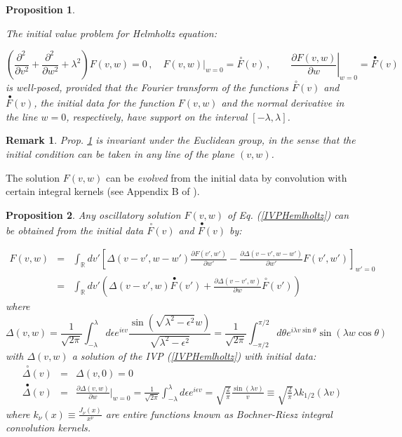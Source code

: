 \documentclass[11pt]{article}
\newtheorem{remark}[definition]{Remark}
\newtheorem{proposition}{Proposition}[section]
\def\Fc{\stackrel{\,\,\circ}{F}}
\def\Fb{\stackrel{\,\,\bullet}{F}}
\def\Dc{\stackrel{\,\,\circ}{\Delta}}
\def\Db{\stackrel{\,\,\bullet}{\Delta}}
\begin{document}
\begin{proposition}\label{PropIVP}
   
  The initial value problem for Helmholtz equation: 

  
\begin{equation}\label{IVPHemlholtz}
 \left(\frac{\partial^2\,}{\partial v^2}+\frac{\partial^2\,}{\partial w^2}+\lambda^2\right)F(v,w)=0 \,,\quad F(v,w)|_{w=0}=\Fc(v)\,,\qquad \left.\frac{\partial F(v,w)}{\partial w}\right|_{w=0}=\Fb(v)
\end{equation}
%
is well-posed, provided that the Fourier transform of the functions $\Fc(v)$ and  $\Fb(v)$, the initial data for the function  $F(v,w)$ and the normal derivative in the line $w=0$, respectively, have support on the interval $[-\lambda,\lambda]$.
\end{proposition}

\begin{remark}\label{RemarkInvariance}
 Prop. \ref{PropIVP}  is invariant under the Euclidean group, in the sense that the initial condition can be taken in any line of the plane $(v,w)$.
\end{remark}


The solution $F(v,w)$ can be \textit{evolved} from the initial data by convolution with certain integral kernels (see Appendix B of \cite{SphereMomentum20}).
%
\begin{proposition}\label{PropPropagationHelmholtz}
Any oscillatory solution $F(v,w)$ of Eq. (\ref{IVPHemlholtz})  can be obtained from the initial 
data $\Fc(v)$ and  $\Fb(v)$ by:

 \begin{eqnarray}
 F(v,w)&=&\int_\mathbb{R} dv'\left[ \Delta(v-v',w-w')\frac{\partial F(v',w')}{\partial w'}-\frac{\partial \Delta(v-v',w-w')}{\partial w'}F(v',w')\right]_{w'=0} \nonumber \\
  &=& \int_\mathbb{R} dv'\left(\Delta(v-v',w) \Fb(v') + \frac{\partial \Delta(v-v',w)}{\partial w} \Fc(v')\right) \label{PropagationHelmholtz}
\end{eqnarray}
%
where 
\begin{equation}
 \Delta(v,w)=\frac{1}{\sqrt{2\pi}}\int_{-\lambda}^\lambda d\epsilon  e^{i \epsilon v} \frac{\sin(\sqrt{\lambda^2-\epsilon^2}w)}{\sqrt{\lambda^2-\epsilon^2}} = \frac{1}{\sqrt{2\pi}}\int_{-\pi/2}^{\pi/2}d\theta
 e^{i \lambda v \sin\theta}\sin(\lambda w \cos\theta) 
\end{equation}
%
%
with $\Delta(v,w)$ a solution of the IVP  (\ref{IVPHemlholtz}) with initial data:
%
\begin{eqnarray}
 \Dc(v) &=& \Delta(v,0)=0\\
 \Db(v)& =& \frac{\partial \Delta(v,w)}{\partial w}|_{w=0} = \frac{1}{\sqrt{2\pi}}\int_{-\lambda}^\lambda d\epsilon  e^{i \epsilon v} = \sqrt{\frac{2}{\pi}} \frac{\sin(\lambda v)}{v} \equiv \sqrt{\frac{2}{\pi}}\lambda k_{1/2}( \lambda v)
\end{eqnarray}
%
where $k_\nu(x)\equiv \frac{J_\nu(x)}{x^\nu}$ are entire functions known as Bochner-Riesz integral convolution kernels.

 
\end{proposition}
\end{document}
